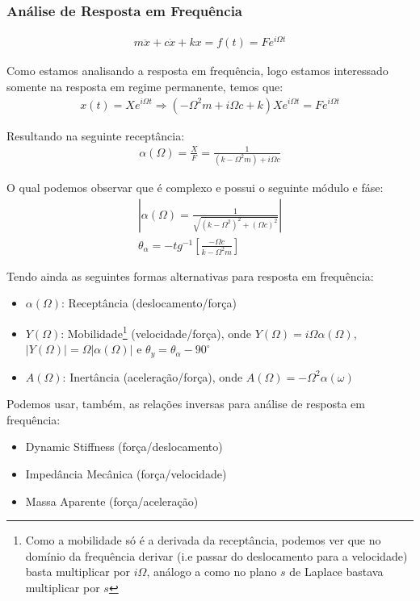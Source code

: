 \documentclass{article}
\begin{document}
\subsubsection*{Análise de Resposta em Frequência}
\begin{align*}
    m\ddot x + c\dot x + kx = f(t) = Fe^{i\Omega t}
\end{align*}

Como estamos analisando a resposta em frequência, logo estamos interessado somente na resposta em regime permanente, temos que:
\begin{align*}
    x(t) = Xe^{i\Omega t} \Rightarrow (-\Omega^2m + i\Omega c + k)Xe^{i\Omega t} = Fe^{i\Omega t}
\end{align*}

Resultando na seguinte receptância:
\begin{align*}
    \alpha(\Omega) = \frac{X}{F} = \frac{1}{(k - \Omega^2 m) + i \Omega c}
\end{align*}

O qual podemos observar que é complexo e possui o seguinte módulo e fáse:
\begin{align*}
    |\alpha(\Omega) = \frac{1}{\sqrt{(k - \Omega^2)^2 + (\Omega c)^2}}| \\
    \theta_\alpha = -tg^{-1} \left[\frac{-\Omega c}{k - \Omega^2 m}\right]
\end{align*}

Tendo ainda as seguintes formas alternativas para resposta em frequência:
\begin{itemize}
    \item $\alpha(\Omega)$: Receptância (deslocamento/força)
    \item $Y(\Omega)$: Mobilidade\footnote{Como a mobilidade só é a derivada da receptância, podemos ver que no domínio da frequência derivar (i.e passar do deslocamento para a velocidade) basta multiplicar por $i\Omega$, análogo a como no plano $s$ de Laplace bastava multiplicar por $s$} (velocidade/força), onde $Y(\Omega) = i \Omega \alpha(\Omega)$, $|Y(\Omega)| = \Omega |\alpha(\Omega)|$ e $\theta_y = \theta_\alpha - 90^\circ$
    \item $A(\Omega)$: Inertância (aceleração/força), onde $A(\Omega) = -\Omega^2 \alpha(\omega)$
\end{itemize}

Podemos usar, também, as relações inversas para análise de resposta em frequência:
\begin{itemize}
    \item Dynamic Stiffness (força/deslocamento)
    \item Impedância Mecânica (força/velocidade)
    \item Massa Aparente (força/aceleração)
\end{itemize}
\end{document}
